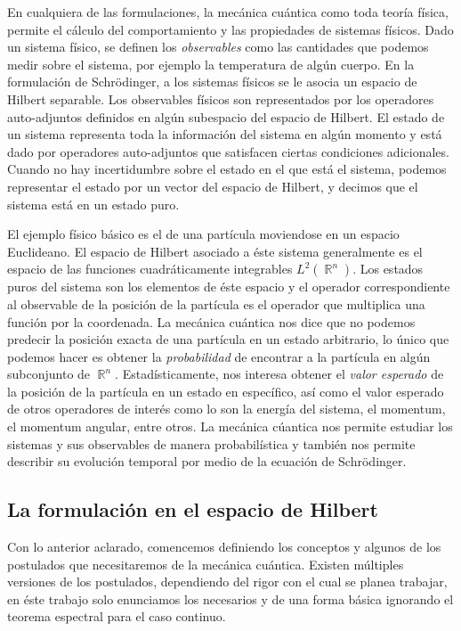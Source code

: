 \documentclass[a4paper]{report}
\DeclareMathOperator{\R}{\mathbb{R}}
\begin{document}
  En cualquiera de las formulaciones, la mecánica cuántica
  como toda teoría física, permite el cálculo del
  comportamiento y las propiedades de sistemas físicos. Dado
  un sistema físico, se definen los \textit{observables}
  como las cantidades que podemos medir sobre el sistema,
  por ejemplo la temperatura de algún cuerpo. En la
  formulación de Schrödinger, a los sistemas físicos se le
  asocia un espacio de Hilbert separable. Los observables
  físicos son representados por los operadores auto-adjuntos
  definidos en algún subespacio del espacio de Hilbert. El
  estado de un sistema representa toda la información del
  sistema en algún momento y está dado por operadores
  auto-adjuntos que satisfacen ciertas condiciones
  adicionales. Cuando no hay incertidumbre sobre el estado
  en el que está el sistema, podemos representar el estado
  por un vector del espacio de Hilbert, y decimos que el
  sistema está en un estado puro.

  El ejemplo físico básico es el de una partícula moviendose
  en un espacio Euclideano. El espacio de Hilbert asociado a
  éste sistema generalmente es el espacio de las funciones
  cuadráticamente integrables $L^2(\R^{n})$. Los estados
  puros del sistema son los elementos de éste espacio y el
  operador correspondiente al observable de la posición de
  la partícula es el operador que multiplica una función por
  la coordenada. La mecánica cuántica nos dice que no
  podemos predecir la posición exacta de una partícula en un
  estado arbitrario, lo único que podemos hacer es obtener
  la \textit{probabilidad} de encontrar a la partícula en
  algún subconjunto de $\R^{n}$.  Estadísticamente, nos
  interesa obtener el \textit{valor esperado} de la posición
  de la partícula en un estado en específico, así como el
  valor esperado de otros operadores de interés como lo son
  la energía del sistema, el momentum, el momentum angular,
  entre otros. La mecánica cúantica nos permite estudiar los
  sistemas y sus observables de manera probabilística y
  también nos permite describir su evolución temporal por
  medio de la ecuación de Schrödinger. 
  
  \subsection{La formulación en el espacio de Hilbert}

  Con lo anterior aclarado, comencemos definiendo los
  conceptos y algunos de los postulados que necesitaremos de
  la mecánica cuántica. Existen múltiples versiones de los
  postulados, dependiendo del rigor con el cual se planea
  trabajar, en éste trabajo solo enunciamos los necesarios y
  de una forma básica ignorando el teorema espectral para el
  caso continuo.
\end{document}
